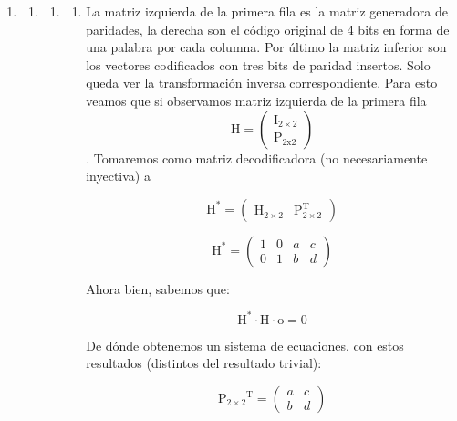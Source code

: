 \begin{enumerate}
\def\labelenumi{\arabic{enumi}.}
\setcounter{enumi}{10}
\item
  \begin{enumerate}
  \def\labelenumii{\arabic{enumii}.}
  \item
    \begin{enumerate}
    \def\labelenumiii{\arabic{enumiii}.}
    \item
      \begin{enumerate}
      \def\labelenumiv{\arabic{enumiv}.}
      \item
        La matriz izquierda de la primera fila es la matriz generadora
        de paridades, la de\-recha son el código original de 4 bits en
        forma de una palabra por cada columna. Por último la matriz
        inferior son los vectores codificados con tres bits de paridad
        insertos. Solo queda ver la transformación inversa
        correspondiente. Para esto vea\-mos que si observamos matriz
        izquierda de la primera
        fila\[\mathtt{\mathrm{H}} = \begin{pmatrix}
        \mathtt{\mathrm{I_{2 \times 2}}} \\
        \mathtt{\mathrm{P_{2x2}}}
        \end{pmatrix}\]. Tomare\-mos como matriz decodificadora (no
        necesariamente inyectiva) a

        \[\mathtt{\mathrm{H}}^{\mathbf{\mathrm{\ast}}} = \begin{pmatrix}
        \mathtt{\mathrm{H_{2 \times 2}}} & \mathtt{\mathrm{P_{2 \times 2}^{T}}}
        \end{pmatrix}\]

        \[\mathtt{\mathrm{H^{\mathtt{\mathbf{\mathrm{\ast}}}}}} = \begin{pmatrix}
        1 & 0 & a & c \\
        0 & 1 & b & d
        \end{pmatrix}\]

        Ahora bien, sabemos que:

        \[{{\mathtt{\mathrm{H^{\mathbf{\mathrm{\ast}}}}} \cdot \mathtt{\mathrm{H}}} \cdot \mathtt{\mathrm{o}}} = \mathtt{\mathrm{0}}\]

        De dónde obtenemos un sistema de ecuaciones, con estos
        resultados (distintos del resultado trivial):

        \[\mathtt{\mathrm{{P_{2 \times 2}}^{\mathtt{\mathbf{\mathrm{T}}}}}} = \begin{pmatrix}
        a & c \\
        b & d
        \end{pmatrix}\]


\end{enumerate}
\end{enumerate}
\end{enumerate}
\end{enumerate}
